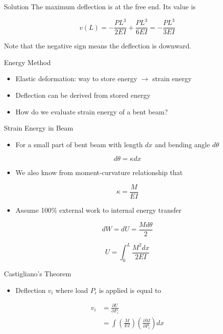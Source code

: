 \documentclass[10pt, svgnames]{beamer}
\begin{document}
\begin{frame}[label={sec:orgb5bc54a}]{Solution}
The maximum deflection is at the free end. Its value is

\[v(L) =  - \frac{PL^3}{2EI} + \frac{PL^3}{6EI} =  - \frac{PL^3}{3EI}\]

Note that the negative sign means the deflection is downward.
\end{frame}

\begin{frame}[label={sec:orgf76da54}]{Energy Method}
\begin{itemize}
\item Elastic deformation: way to store energy \(\rightarrow\) strain energy

\item Deflection can be derived from stored energy

\item How do we evaluate strain energy of a bent beam?
\end{itemize}
\end{frame}

\begin{frame}[label={sec:org5d670e7}]{Strain Energy in Beam}
\begin{itemize}
\item For a small part of bent beam with length \(dx\) and bending angle
\(d\theta\)
\end{itemize}

\[d\theta = \kappa dx\]

\begin{itemize}
\item We also know from moment-curvature relationship that
\end{itemize}

\[\kappa = \frac{M}{EI}\]

\begin{itemize}
\item Assume 100\% external work to internal energy transfer
\end{itemize}

\[dW = dU = \frac{Md\theta}{2}\]

\[U = \int_0^L \frac{M^2 dx}{2EI}\]
\end{frame}

\begin{frame}[label={sec:org56224ce}]{Castigliano's Theorem}
\begin{itemize}
\item Deflection \(v_i\) where load \(P_i\) is applied is equal to
\end{itemize}

\begin{align*}
  v_i &= \frac{\partial U}{\partial P_i} \\
      &= \int \left( \frac{M}{EI} \right) \left( \frac{\partial M}{\partial P_{i}} \right) dx
\end{align*}
\end{frame}
\end{document}
